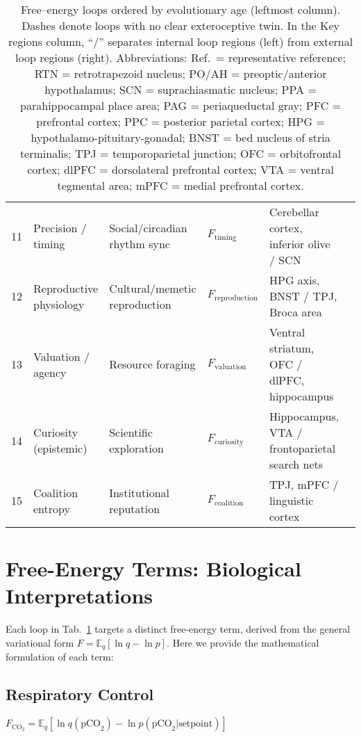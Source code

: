 \documentclass[10pt]{article}
\begin{document}
\begin{table}[ht]
\begin{tabular}{@{}r p{3.0cm} p{3.0cm} p{2.3cm} p{3.5cm} p{1.2cm}@{}}
11 & Precision / timing & Social/circadian rhythm sync & $F_{\text{timing}}$ & Cerebellar cortex, inferior olive / SCN & \cite{popa2018cerebellum}\\
12 & Reproductive physiology & Cultural/memetic reproduction & $F_{\text{reproduction}}$ & HPG axis, BNST / TPJ, Broca area & \cite{clarke2022hpg}\\
13 & Valuation / agency & Resource foraging & $F_{\text{valuation}}$ & Ventral striatum, OFC / dlPFC, hippocampus & \cite{sarter2023attention}\\
14 & Curiosity (epistemic) & Scientific exploration & $F_{\text{curiosity}}$ & Hippocampus, VTA / frontoparietal search nets & \cite{gruber2022curiosity}\\
15 & Coalition entropy & Institutional reputation & $F_{\text{coalition}}$ & TPJ, mPFC / linguistic cortex & \cite{scholz2023rtpj}\\

\bottomrule
\end{tabular}
\caption{Free--energy loops ordered by evolutionary age (leftmost column).  Dashes denote loops with no clear exteroceptive twin. In the Key regions column, ``/'' separates internal loop regions (left) from external loop regions (right).  Abbreviations: 
Ref.\ = representative reference; 
RTN = retrotrapezoid nucleus; 
PO/AH = preoptic/anterior hypothalamus;
SCN = suprachiasmatic nucleus; 
PPA = parahippocampal place area; 
PAG = periaqueductal gray; 
PFC = prefrontal cortex;
PPC = posterior parietal cortex; 
HPG = hypothalamo-pituitary-gonadal; 
BNST = bed nucleus of stria terminalis; 
TPJ = temporoparietal junction; 
OFC = orbitofrontal cortex; 
dlPFC = dorsolateral prefrontal cortex; 
VTA = ventral tegmental area; 
mPFC = medial prefrontal cortex.}
\label{tab:ledger}
\end{table}

\section{Free-Energy Terms: Biological Interpretations}

Each loop in Tab.~\ref{tab:ledger} targets a distinct free-energy term, derived from the general variational form $F = \mathbb{E}_q[\ln q - \ln p]$. Here we provide the mathematical formulation of each term:

\subsection{Respiratory Control}
$F_{\text{CO}_2} = \mathbb{E}_q[\ln q(\text{pCO}_2) - \ln p(\text{pCO}_2|\text{setpoint})]$
\end{document}
